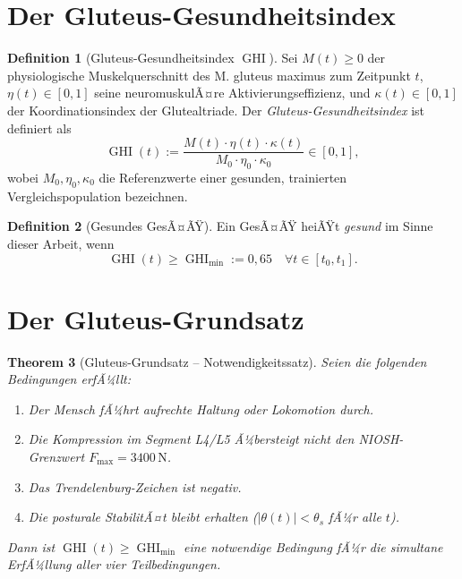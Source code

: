 ﻿\documentclass[12pt,a4paper]{report}
\theoremstyle{plain}
\newtheorem{theorem}{Theorem}[section]
\theoremstyle{definition}
\newtheorem{definition}[theorem]{Definition}
\theoremstyle{remark}
\DeclareMathOperator{\GHI}{GHI}
\begin{document}
	\section{Der Gluteus-Gesundheitsindex}
	
	\begin{definition}[Gluteus-Gesundheitsindex $\GHI$]
		\label{def:ghi}
		Sei $M(t) \geq 0$ der physiologische Muskelquerschnitt des M. gluteus maximus
		zum Zeitpunkt $t$, $\eta(t) \in [0,1]$ seine neuromuskulÃ¤re Aktivierungseffizienz,
		und $\kappa(t) \in [0,1]$ der Koordinationsindex der Glutealtriade. Der
		\emph{Gluteus-Gesundheitsindex} ist definiert als
		\[
		\GHI(t) := \frac{M(t) \cdot \eta(t) \cdot \kappa(t)}{M_0 \cdot \eta_0 \cdot \kappa_0}
		\in [0,1],
		\]
		wobei $M_0,\eta_0,\kappa_0$ die Referenzwerte einer gesunden, trainierten
		Vergleichspopulation bezeichnen.
	\end{definition}
	
	\begin{definition}[Gesundes GesÃ¤ÃŸ]
		\label{def:gesund}
		Ein GesÃ¤ÃŸ heiÃŸt \emph{gesund} im Sinne dieser Arbeit, wenn
		\[
		\GHI(t) \geq \GHI_{\min} := 0{,}65 \quad \forall t \in [t_0, t_1].
		\]
	\end{definition}
	
	\section{Der Gluteus-Grundsatz}
	
	\begin{theorem}[Gluteus-Grundsatz -- Notwendigkeitssatz]
		\label{thm:grundsatz}
		Seien die folgenden Bedingungen erfÃ¼llt:
		\begin{enumerate}[label=(\roman*)]
			\item Der Mensch fÃ¼hrt aufrechte Haltung oder Lokomotion durch.
			\item Die Kompression im Segment L4/L5 Ã¼bersteigt nicht den NIOSH-Grenzwert
			$F_{\max} = 3400\,\mathrm{N}$.
			\item Das Trendelenburg-Zeichen ist negativ.
			\item Die posturale StabilitÃ¤t bleibt erhalten ($|\theta(t)| < \theta_s$
			fÃ¼r alle $t$).
		\end{enumerate}
		Dann ist $\GHI(t) \geq \GHI_{\min}$ eine \emph{notwendige} Bedingung
		fÃ¼r die simultane ErfÃ¼llung aller vier Teilbedingungen.
	\end{theorem}
	
\end{document}
